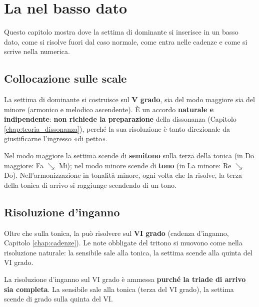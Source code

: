 \chapter{La  nel basso dato}
\label{chap:v7_basso}

Questo capitolo mostra dove la settima di dominante si inserisce in un basso dato, come si risolve fuori dal caso normale, come entra nelle cadenze e come si scrive nella numerica.

\section{Collocazione sulle scale}
\label{sec:v7_basso_dato}

\begin{regola}
	\label{reg:collocazione_v7}
	La settima di dominante si costruisce sul \textbf{V grado}, sia del modo maggiore sia del minore (armonico e melodico ascendente). È un accordo \textbf{naturale e indipendente}: \textbf{non richiede la preparazione} della dissonanza (Capitolo \ref{chap:teoria_dissonanza}), perché la sua risoluzione è tanto direzionale da giustificarne l'ingresso «di petto».
\end{regola}

\begin{osservazione}
	Nel modo maggiore la settima scende di \textbf{semitono} sulla terza della tonica (in Do maggiore: Fa $\searrow$ Mi); nel modo minore scende di \textbf{tono} (in La minore: Re $\searrow$ Do). Nell'armonizzazione in tonalità minore, ogni volta che la  risolve, la terza della tonica di arrivo si raggiunge scendendo di un tono.
\end{osservazione}

\section{Risoluzione d'inganno}
\label{sec:v7_inganno}

Oltre che sulla tonica, la  può risolvere sul \textbf{VI grado} (cadenza d'inganno, Capitolo \ref{chap:cadenze}). Le note obbligate del tritono si muovono come nella risoluzione naturale: la sensibile sale alla tonica, la settima scende alla quinta del VI grado.

\begin{regola}
	\label{reg:v7_inganno}
	La risoluzione d'inganno sul VI grado è ammessa \textbf{purché la triade di arrivo sia completa}. La sensibile sale alla tonica (terza del VI grado), la settima scende di grado sulla quinta del VI.
\end{regola}

